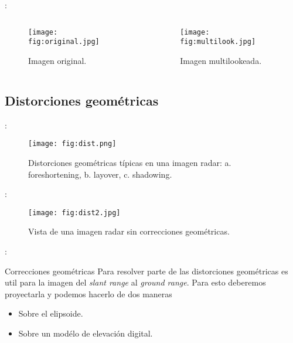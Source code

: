 \begin{frame}{\secname : \subsecname}
  \begin{columns}
  \begin{column}{0.5\textwidth}
    \begin{figure}
      \centering
      \texttt{[image: fig:original.jpg]}
      \caption{Imagen original.}
      \label{}
    \end{figure}
  \end{column}
  \begin{column}{0.5\textwidth}  %
    \begin{figure}
      \centering
      \texttt{[image: fig:multilook.jpg]}
      \caption{Imagen multilookeada.}
      \label{}
    \end{figure}
  \end{column}
  \end{columns}
\end{frame}


\subsection{Distorciones geométricas}

\begin{frame}{\secname : \subsecname}
      \begin{figure}
        \centering
        \texttt{[image: fig:dist.png]}
        \caption{Distorciones geométricas típicas en una imagen radar: a. foreshortening, b. layover, c. shadowing.}
        \label{}
      \end{figure}
\end{frame}

\begin{frame}{\secname : \subsecname}
    \begin{figure}
      \centering
      \texttt{[image: fig:dist2.jpg]}
      \caption{Vista de una imagen radar sin correcciones geométricas.}
      \label{}
    \end{figure}
\end{frame}

\begin{frame}{\secname : \subsecname}
  \begin{block}{Correcciones geométricas}
    Para resolver parte de las distorciones geométricas es util para la imagen del \emph{slant range} al \emph{ground range}. Para esto deberemos proyectarla y podemos hacerlo de dos maneras
    \begin{itemize}
      \item Sobre el elipsoide.
      \item Sobre un modélo de elevación digital.
    \end{itemize}
  \end{block}
\end{frame}

